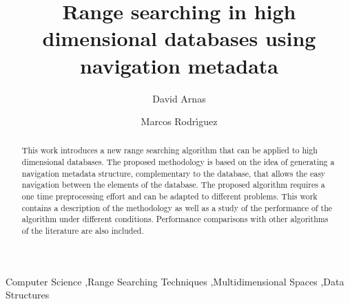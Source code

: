 \documentclass[preprint,12pt]{elsarticle}
\begin{document}
\begin{frontmatter}



\title{Range searching in high dimensional databases using navigation metadata}

\author[label]{David Arnas}
\author[label]{Marcos Rodr\'{\i}guez}
\address[label]{Centro Universitario de la Defensa de Zaragoza. IUMA.}


\begin{abstract}
This work introduces a new range searching algorithm that can be applied to high dimensional databases. The proposed methodology is based on the idea of generating a navigation metadata structure, complementary to the database, that allows the easy navigation between the elements of the database. The proposed algorithm requires a one time preprocessing effort and can be adapted to different problems. This work contains a description of the methodology as well as a study of the performance of the algorithm under different conditions. Performance comparisons with other algorithms of the literature are also included. 
\end{abstract}

\begin{keyword}
Computer Science \sep Range Searching Techniques \sep Multidimensional Spaces \sep Data Structures



\end{keyword}

\end{frontmatter}
\end{document}
